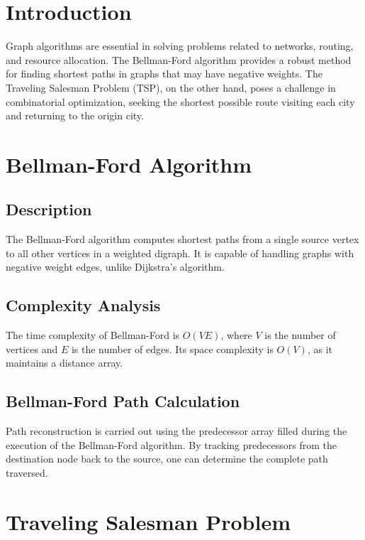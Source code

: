 \documentclass[12pt, a4paper]{article}
\begin{document}
\tableofcontents
\newpage

\listoffigures
\listoftables
\newpage


\section{Introduction}
Graph algorithms are essential in solving problems related to networks, routing,
and resource allocation. The Bellman-Ford algorithm provides a robust method for
finding shortest paths in graphs that may have negative weights. The Traveling
Salesman Problem (TSP), on the other hand, poses a challenge in combinatorial
optimization, seeking the shortest possible route visiting each city and
returning to the origin city.

\section{Bellman-Ford Algorithm}
\subsection{Description}
The Bellman-Ford algorithm computes shortest paths from a single source vertex
to all other vertices in a weighted digraph. It is capable of handling graphs
with negative weight edges, unlike Dijkstra's algorithm.

\subsection{Complexity Analysis}
The time complexity of Bellman-Ford is \(O(VE)\), where \(V\) is the number of
vertices and \(E\) is the number of edges. Its space complexity is \(O(V)\), as
it maintains a distance array.

\subsection{Bellman-Ford Path Calculation}
Path reconstruction is carried out using the predecessor array filled during the
execution of the Bellman-Ford algorithm. By tracking predecessors from the
destination node back to the source, one can determine the complete path
traversed.

\section{Traveling Salesman Problem}
\end{document}
